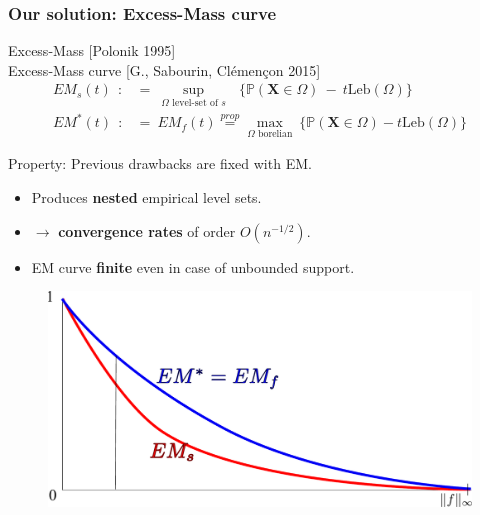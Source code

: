 \documentclass[9pt]{beamer}
\newcommand\blue{\color{blue} }
\def\mb{\mathbf}
\def\leb{\text{Leb}}
\begin{document}
\begin{frame}
\frametitle{Our solution: Excess-Mass curve}

Excess-Mass {\small [Polonik 1995]}\\
{\blue \large Excess-Mass curve {\small [G., Sabourin, Clémençon 2015]}}
\begin{align*}
EM_s(t) ~~:&=~ \sup_{\Omega \text{ level-set of } s}~~~\big\{ \mathbb{P}(\mb X \in \Omega) ~-~ t \leb(\Omega) \big\}\\
EM^*(t) ~~:&=~  EM_f(t) \overset{prop}{=}  \max_{\Omega\text{ borelian} } ~\big\{{\mathbb{P}} (\mb X\in \Omega)-t\leb(\Omega) \big\} 
\end{align*}

\begin{alertblock}{Property: Previous drawbacks are fixed with EM.}
\begin{itemize}
\item Produces \textbf{nested} empirical level sets.
\item $\to$ \textbf{convergence rates} of order $O(n^{-1/2})$.
\item EM curve \textbf{finite} even in case of unbounded support.
\end{itemize}
\end{alertblock}


\begin{figure}
\includegraphics[width = 0.6\linewidth]{sourcefigs/em.pdf}
\end{figure}


\end{frame}


\end{document}
